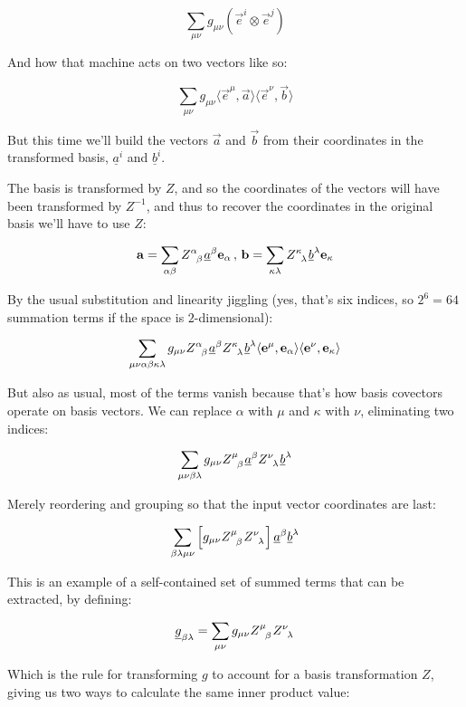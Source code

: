 $$
\sum_{\mu\nu} g_{\mu\nu} (\vec{e}^i \otimes \vec{e}^j)
$$

And how that machine acts on two vectors like so:

$$
\sum_{\mu\nu} g_{\mu\nu} \langle \vec{e}^\mu,\vec{a} \rangle \langle \vec{e}^\nu,\vec{b} \rangle
$$

But this time we'll build the vectors $\vec{a}$ and $\vec{b}$ from their coordinates in the transformed basis, $\underline{a}^{i}$ and $\underline{b}^{i}$.

The basis is transformed by $Z$, and so the coordinates of the vectors will have been transformed by $Z^{-1}$, and thus to recover the coordinates in the original basis we'll have to use $Z$:

$$
\vec{a} = \sum_{\alpha\beta} Z\indices{^\alpha_\beta} \underline{a}^{\beta} \vec{e}_{\alpha}
\, , \,
\vec{b} = \sum_{\kappa\lambda} Z\indices{^\kappa_\lambda} \underline{b}^{\lambda} \vec{e}_{\kappa}
$$

By the usual substitution and linearity jiggling (yes, that's six indices, so $2^6 = 64$ summation terms if the space is $2$-dimensional):

$$
\sum_{\mu\nu\alpha\beta\kappa\lambda} g_{\mu\nu} Z\indices{^\alpha_\beta} \underline{a}^{\beta} Z\indices{^\kappa_\lambda} \underline{b}^{\lambda} \langle \vec{e}^\mu, \vec{e}_\alpha \rangle \langle \vec{e}^\nu, \vec{e}_\kappa \rangle
$$

But also as usual, most of the terms vanish because that's how basis covectors operate on basis vectors. We can replace $\alpha$ with $\mu$ and $\kappa$ with $\nu$, eliminating two indices:

$$
\sum_{\mu\nu\beta\lambda} g_{\mu\nu} Z\indices{^\mu_\beta} \underline{a}^{\beta} Z\indices{^\nu_\lambda} \underline{b}^{\lambda}
$$

Merely reordering and grouping so that the input vector coordinates are last:

$$
\sum_{\beta\lambda\mu\nu} \left[g_{\mu\nu} Z\indices{^\mu_\beta} Z\indices{^\nu_\lambda} \right] \underline{a}^{\beta} \underline{b}^{\lambda} 
$$

This is an example of a self-contained set of summed terms that can be extracted, by defining:

$$
\underline{g}_{\beta\lambda} = 
\sum_{\mu\nu} g_{\mu\nu} Z\indices{^\mu_\beta} Z\indices{^\nu_\lambda}
$$

Which is the rule for transforming $g$ to account for a basis transformation $Z$, giving us two ways to calculate the same inner product value:

